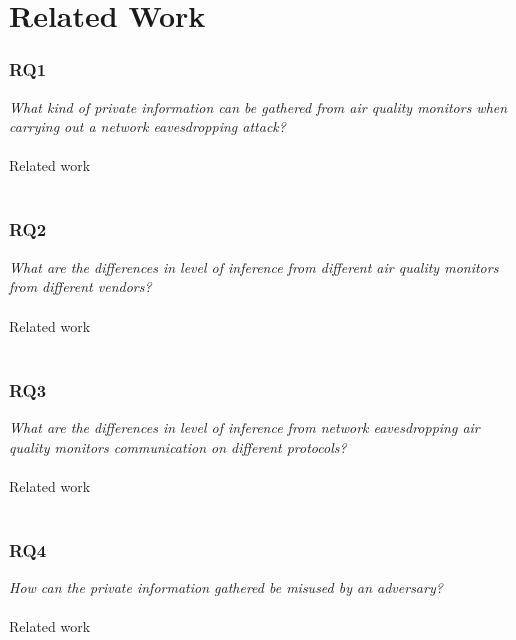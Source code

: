 \chapter*{Related Work}

\subsection*{\textbf{RQ1}}
\textit{What kind of private information can be gathered from air quality monitors when carrying out a network eavesdropping attack?}
\\\\
Related work\\\\

\subsection*{\textbf{RQ2}}
\textit{What are the differences in level of inference from different air quality monitors from different vendors?}
\\\\
Related work\\\\

\subsection*{\textbf{RQ3}}
\textit{What are the differences in level of inference from network eavesdropping air quality monitors communication on different protocols?}
\\\\
Related work\\\\

\subsection*{\textbf{RQ4}}
\textit{How can the private information gathered be misused by an adversary?}
\\\\
Related work\\\\